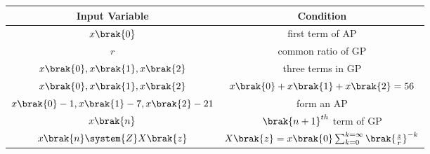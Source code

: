 \begin{tabular}{|c|c|}
        \hline
         Input Variable & Condition\\
        \hline
         $x\brak{0}$ & first term of AP\\
         \hline
         $r$ & common ratio of GP\\
         \hline
         $x\brak{0},x\brak{1},x\brak{2}$ & three terms in GP \\
         \hline
         $x\brak{0},x\brak{1},x\brak{2}$ & $x\brak{0}+x\brak{1}+x\brak{2}=56$ \\
         \hline
          $x\brak{0}-1,x\brak{1}-7,x\brak{2}-21$ & form an AP \\
         \hline
          $x\brak{n}$ & $\brak{n+1}^{th}$ term of GP \\
         \hline
         $x\brak{n}\system{Z}X\brak{z}$ & $X\brak{z}=x\brak{0}\sum_{k=0}^{k=\infty}\brak{\frac{z}{r}}^{-k}$\\
         \hline
    \end{tabular}
